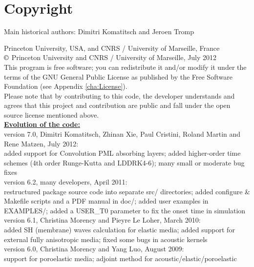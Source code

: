 
\chapter*{Copyright}

Main historical authors: Dimitri Komatitsch and Jeroen Tromp

Princeton University, USA, and CNRS / University of Marseille, France\\
$\copyright$ Princeton University and CNRS / University of Marseille, July 2012\\

\noindent
This program is free software; you can redistribute it and/or modify
it under the terms of the GNU General Public License as published
by the Free Software Foundation (see Appendix \ref{cha:License}).\\

\noindent
Please note that by contributing to this code, the developer understands and agrees that this project and contribution
are public and fall under the open source license mentioned above.\\

\noindent
\textbf{\underline{Evolution of the code:}}\\

version 7.0, Dimitri Komatitsch, Zhinan Xie, Paul Cristini, Roland Martin and Rene Matzen, July 2012:\\
added support for Convolution PML absorbing layers;
added higher-order time schemes (4th order Runge-Kutta and LDDRK4-6);
many small or moderate bug fixes\\

version 6.2, many developers, April 2011:\\
restructured package source code into separate src/ directories;
added configure \& Makefile scripts and a PDF manual in doc/;
added user examples in EXAMPLES/;
added a USER\_T0 parameter to fix the onset time in simulation\\

version 6.1, Christina Morency and Pieyre Le Loher, March 2010:\\
added SH (membrane) waves calculation for elastic media;
added support for external fully anisotropic media;
fixed some bugs in acoustic kernels\\

version 6.0, Christina Morency and Yang Luo, August 2009:\\
support for poroelastic media;
adjoint method for acoustic/elastic/poroelastic\\

